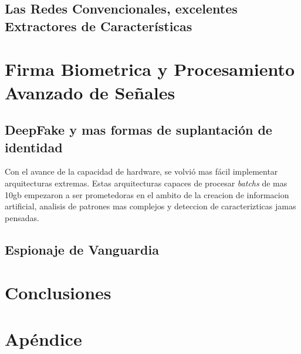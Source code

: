 \documentclass[a4paper]{IEEEtranUNT}
\begin{document}
\subsection{Las Redes Convencionales, excelentes Extractores de Características}


\section{Firma Biometrica y Procesamiento Avanzado de Señales}

\subsection{DeepFake y mas formas de suplantación de identidad}

Con el avance de la capacidad de hardware, se volvió mas fácil implementar arquitecturas extremas. 
Estas arquitecturas capaces de procesar \textit{batchs} de mas 10gb empezaron a ser prometedoras en el
ambito de la creacion de informacion artificial, analisis de patrones mas complejos y deteccion de 
caracterizticas jamas pensadas.

\subsection{Espionaje de Vanguardia}

\section{Conclusiones}

\section{Apéndice}




\end{document}
